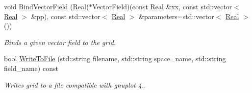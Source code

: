 \begin{DoxyCompactItemize}
void \hyperlink{classmtk_1_1UniStgGrid1D_ac6f8c592636dfa5a92217ac82405976d}{Bind\+Vector\+Field} (\hyperlink{group__c01-roots_gac080bbbf5cbb5502c9f00405f894857d}{Real}($\ast$Vector\+Field)(const \hyperlink{group__c01-roots_gac080bbbf5cbb5502c9f00405f894857d}{Real} \&xx, const std\+::vector$<$ \hyperlink{group__c01-roots_gac080bbbf5cbb5502c9f00405f894857d}{Real} $>$ \&pp), const std\+::vector$<$ \hyperlink{group__c01-roots_gac080bbbf5cbb5502c9f00405f894857d}{Real} $>$ \&parameters=std\+::vector$<$ \hyperlink{group__c01-roots_gac080bbbf5cbb5502c9f00405f894857d}{Real} $>$())
\begin{DoxyCompactList}\small\item\em Binds a given vector field to the grid. \end{DoxyCompactList}\item 
bool \hyperlink{classmtk_1_1UniStgGrid1D_a6d2c10aa9468a037829f0eb043b898dc}{Write\+To\+File} (std\+::string filename, std\+::string space\+\_\+name, std\+::string field\+\_\+name) const 
\begin{DoxyCompactList}\small\item\em Writes grid to a file compatible with gnuplot 4.. \end{DoxyCompactList}\end{DoxyCompactItemize}
